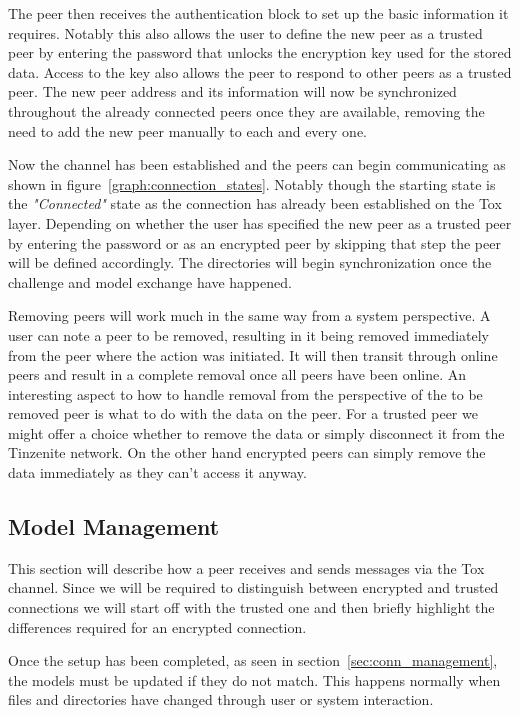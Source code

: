 The peer then receives the authentication block to set up the basic information it requires.
Notably this also allows the user to define the new peer as a trusted peer by entering the password that unlocks the encryption key used for the stored data.
Access to the key also allows the peer to respond to other peers as a trusted peer.
The new peer address and its information will now be synchronized throughout the already connected peers once they are available, removing the need to add the new peer manually to each and every one.

Now the channel has been established and the peers can begin communicating as shown in figure~\ref{graph:connection_states}.
Notably though the starting state is the \textit{"Connected"} state as the connection has already been established on the Tox layer.
Depending on whether the user has specified the new peer as a trusted peer by entering the password or as an encrypted peer by skipping that step the peer will be defined accordingly.
The directories will begin synchronization once the challenge and model exchange have happened.

Removing peers will work much in the same way from a system perspective.
A user can note a peer to be removed, resulting in it being removed immediately from the peer where the action was initiated.
It will then transit through online peers and result in a complete removal once all peers have been online.
An interesting aspect to how to handle removal from the perspective of the to be removed peer is what to do with the data on the peer.
For a trusted peer we might offer a choice whether to remove the data or simply disconnect it from the Tinzenite network.
On the other hand encrypted peers can simply remove the data immediately as they can't access it anyway.

\subsection{Model Management}

This section will describe how a peer receives and sends messages via the Tox channel.
Since we will be required to distinguish between encrypted and trusted connections we will start off with the trusted one and then briefly highlight the differences required for an encrypted connection.

Once the setup has been completed, as seen in section~\ref{sec:conn_management}, the models must be updated if they do not match.
This happens normally when files and directories have changed through user or system interaction.

